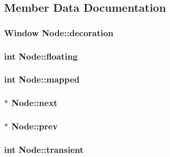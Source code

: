 \subsection{Member Data Documentation}
\hypertarget{structNode_a58ff43cedbc9c788aa1298715042768d}{}
\subsubsection[{decoration}]{\setlength{\rightskip}{0pt plus 5cm}Window Node\+::decoration}\label{structNode_a58ff43cedbc9c788aa1298715042768d}
\hypertarget{structNode_ac759c6f57f027e265a5e369a69114479}{}
\subsubsection[{floating}]{\setlength{\rightskip}{0pt plus 5cm}int Node\+::floating}\label{structNode_ac759c6f57f027e265a5e369a69114479}
\hypertarget{structNode_a9f51700be8fa8a1e0c032f0f18f9f744}{}
\subsubsection[{mapped}]{\setlength{\rightskip}{0pt plus 5cm}int Node\+::mapped}\label{structNode_a9f51700be8fa8a1e0c032f0f18f9f744}
\hypertarget{structNode_a2559a716f69ccaa76d648d9f1b83065e}{}
\subsubsection[{next}]{$\ast$ Node\+::next}\label{structNode_a2559a716f69ccaa76d648d9f1b83065e}
\hypertarget{structNode_a632ea91c6a13082308f7692649a68880}{}
\subsubsection[{prev}]{$\ast$ Node\+::prev}\label{structNode_a632ea91c6a13082308f7692649a68880}
\hypertarget{structNode_ab914f0acd82df7f22818d31337442792}{}
\subsubsection[{transient}]{\setlength{\rightskip}{0pt plus 5cm}int Node\+::transient}\label{structNode_ab914f0acd82df7f22818d31337442792}
\hypertarget{structNode_a9b48ab73d4bb7a253057af4aaa165a1d}{}
